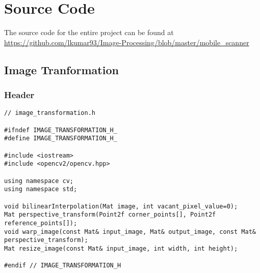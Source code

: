 
\chapter{Source Code} %
\label{AppendixB}
The source code for the entire project can be found at \\
\url{https://github.com/lkumar93/Image-Processing/blob/master/mobile_scanner}

\section{Image Tranformation}

\subsection{Header}
\begin{lstlisting}
// image_transformation.h

#ifndef IMAGE_TRANSFORMATION_H_
#define IMAGE_TRANSFORMATION_H_

#include <iostream>
#include <opencv2/opencv.hpp>

using namespace cv;
using namespace std;

void bilinearInterpolation(Mat image, int vacant_pixel_value=0);
Mat perspective_transform(Point2f corner_points[], Point2f reference_points[]);
void warp_image(const Mat& input_image, Mat& output_image, const Mat& perspective_transform);
Mat resize_image(const Mat& input_image, int width, int height);

#endif // IMAGE_TRANSFORMATION_H


\end{lstlisting}

